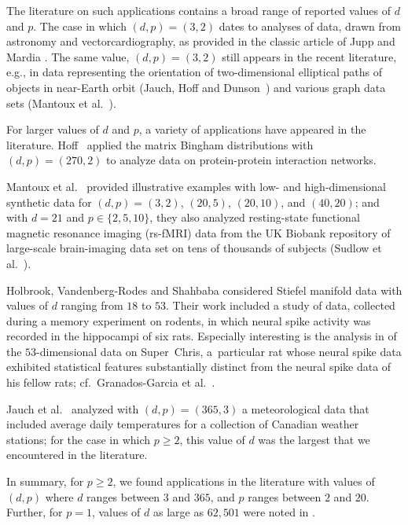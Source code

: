 \documentclass[pdftex]{sigma}
\numberwithin{equation}{section}
\begin{document}
The literature on such applications contains a broad range of reported values of $d$ and $p$. The case in which $(d,p) = (3,2)$ dates to analyses of data, drawn from astronomy and vectorcardiography, as provided in the classic article of Jupp and Mardia \cite{JuppMardia}. The same value, $(d,p) = (3,2)$ still appears in the recent literature, e.g., in data representing the orientation of two-dimensional elliptical paths of objects in near-Earth orbit (Jauch, Hoff and Dunson~\cite{JauchHoffDunson}) and various graph data sets (Mantoux et al.~\cite{Mantoux_etal}).

For larger values of $d$ and $p$, a variety of applications have appeared in the literature. Hoff~\cite{Hoff} applied the matrix Bingham distributions with $(d,p) = (270,2)$ to analyze data on protein-protein interaction networks.

Mantoux et al.~\cite{Mantoux_etal} provided illustrative examples with low- and high-dimensional synthetic data for $(d,p) = (3,2)$, $(20,5)$, $(20,10)$, and $(40,20)$; and with $d = 21$ and $p \in \{2,5,10\}$, they also analyzed resting-state functional magnetic resonance imaging (rs-fMRI) data from the UK Biobank repository of large-scale brain-imaging data set on tens of thousands of subjects (Sudlow et al.~\cite{Sudlow_etal}).

Holbrook, Vandenberg-Rodes and Shahbaba \cite{Holbrook_etal} considered Stiefel manifold data with values of $d$ ranging from $18$ to $53$. Their work included a study of data, collected during a memory experiment on rodents, in which neural spike activity was recorded in the hippocampi of six rats. Especially interesting is the analysis in \cite{Holbrook_etal} of the $53$-dimensional data on Super~Chris, a~particular rat whose neural spike data exhibited statistical features substantially distinct from the neural spike data of his fellow rats; cf.\ Granados-Garcia et al.~\cite{GranadosGarcia}.

Jauch et al.~\cite{JauchHoffDunson} analyzed with $(d,p) = (365,3)$ a meteorological data that included average daily temperatures for a collection of Canadian weather stations; for the case in which $p \ge 2$, this value of $d$ was the largest that we encountered in the literature.

In summary, for $p \ge 2$, we found applications in the literature with values of $(d,p)$ where $d$ ranges between $3$ and $365$, and $p$ ranges between $2$ and $20$. Further, for $p=1$, values of $d$ as large as $62,501$ were noted in \cite[Section~4]{BagyanRichards}.
\end{document}
